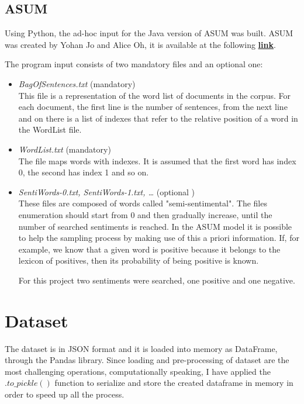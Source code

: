 \documentclass[a4paper,12pt]{article}
\begin{document}
\subsection{ASUM}
Using Python, the ad-hoc input for the Java version of ASUM was built. ASUM was created by Yohan Jo and Alice Oh, it is available at the following  \href{http://www.cs.cmu.edu/~yohanj/research/WSDM11/index.html}{\textbf{link}}.

\noindent The program input consists of two mandatory files and an optional one:
\begin{itemize}
	\item \textit{BagOfSentences.txt} (mandatory)\\ 
	This file is a representation of the word list of documents in the corpus. For each document, the first line is the number of sentences, from the next line and on there is a list of indexes that refer to the relative position of a word in the WordList file. 
	\item \textit{WordList.txt} (mandatory)\\
	The file maps words with indexes. It is assumed that the first word has index 0, the second has index 1 and so on.
	\item \textit{SentiWords-0.txt, SentiWords-1.txt, … } (optional )\\
	These files are composed of words called "semi-sentimental". The files enumeration should start from 0 and then gradually increase, until the number of searched sentiments is reached. In the ASUM model it is possible to help the sampling process by making use of this a priori information. If, for example, we know that a given word is positive because it belongs to the lexicon of positives, then its probability of being positive is known.
	
	For this project two sentiments were searched, one positive and one negative. 
\end{itemize}

\newpage

\section{Dataset}
The dataset is in JSON format and it is loaded into memory as DataFrame, through the Pandas library. Since loading and pre-processing of dataset are the most challenging operations, computationally speaking, I have applied the $.to\_pickle()$ function to serialize and store the created dataframe in memory in order to speed up all the process.
\end{document}
